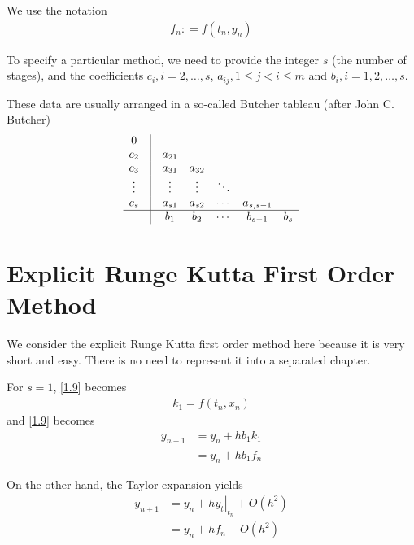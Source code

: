 \documentclass[a4paper,oneside]{book}
\numberwithin{equation}{chapter}
\begin{document}
We use the notation
\begin{align}
{f_n}: = f\left( {{t_n},{y_n}} \right)
\end{align}

To specify a particular method, we need to provide the integer $s$ (the number of stages), and the coefficients $c_i,i=2,\ldots,s$, $a_{ij},1\le j<i\le m$ and $b_i,i=1,2,\ldots,s$.

These data are usually arranged in a so-called Butcher tableau (after John C. Butcher)
\begin{align}
\begin{array}{*{20}{c}}
  0&\vline & {}&{}&{}&{}&{} \\ 
  {{c_2}}&\vline & {{a_{21}}}&{}&{}&{}&{} \\ 
  {{c_3}}&\vline & {{a_{31}}}&{{a_{32}}}&{}&{}&{} \\ 
   \vdots &\vline &  \vdots & \vdots & \ddots &{}&{} \\ 
  {{c_s}}&\vline & {{a_{s1}}}&{{a_{s2}}}& \cdots &{{a_{s,s - 1}}}&{} \\ 
\hline
  {}&\vline & {{b_1}}&{{b_2}}& \cdots &{{b_{s - 1}}}&{{b_s}} 
\end{array}
\end{align}
\section{Explicit Runge Kutta First Order Method}
We consider the explicit Runge Kutta first order method here because it is very short and easy. There is no need to represent it into a separated chapter.

For $s=1$, \eqref{1.9} becomes
\begin{align}
{k_1} = f\left( {{t_n},{x_n}} \right)
\end{align}
and \eqref{1.9} becomes
\begin{align}
  {{y_{n + 1}}} &= {{y_n}} + h{b_1}{k_1}  \\
   &= {{y_n}} + h{b_1}{f_n}
\label{1.16}
\end{align}

On the other hand, the Taylor expansion yields
\begin{align}
{{y_{n + 1}}} &= {{y_n}} + h{\left. {{y_t}} \right|_{{t_n}}} + O\left( {{h^2}} \right)\\
 &= {{y_n}} + h{f_n} + O\left( {{h^2}} \right)
 \label{1.18}
\end{align}
\end{document}
